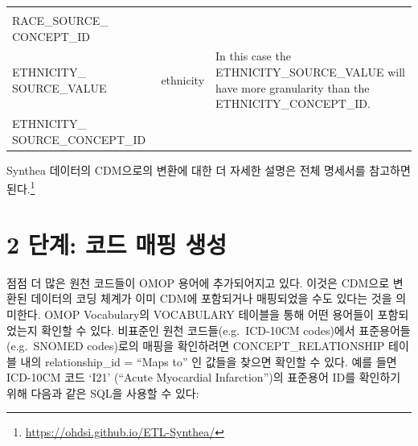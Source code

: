 \documentclass[11pt]{book}
\let\rmarkdownfootnote\footnote%
\def\footnote{\protect\rmarkdownfootnote}
\theoremstyle{definition}
\theoremstyle{definition}
\theoremstyle{definition}
\theoremstyle{remark}
\begin{document}
\begin{longtable}[]{@{}lll@{}}
\begin{minipage}[t]{0.50\columnwidth}
\strut
\end{minipage}\tabularnewline
\begin{minipage}[t]{0.28\columnwidth}\raggedright\strut
RACE\_SOURCE\_ CONCEPT\_ID\strut
\end{minipage} & \begin{minipage}[t]{0.13\columnwidth}\raggedright\strut
\strut
\end{minipage} & \begin{minipage}[t]{0.50\columnwidth}\raggedright\strut
\strut
\end{minipage}\tabularnewline
\begin{minipage}[t]{0.28\columnwidth}\raggedright\strut
ETHNICITY\_ SOURCE\_VALUE\strut
\end{minipage} & \begin{minipage}[t]{0.13\columnwidth}\raggedright\strut
ethnicity\strut
\end{minipage} & \begin{minipage}[t]{0.50\columnwidth}\raggedright\strut
In this case the ETHNICITY\_SOURCE\_VALUE will have more granularity
than the ETHNICITY\_CONCEPT\_ID.\strut
\end{minipage}\tabularnewline
\begin{minipage}[t]{0.28\columnwidth}\raggedright\strut
ETHNICITY\_ SOURCE\_CONCEPT\_ID\strut
\end{minipage} & \begin{minipage}[t]{0.13\columnwidth}\raggedright\strut
\strut
\end{minipage} & \begin{minipage}[t]{0.50\columnwidth}\raggedright\strut
\strut
\end{minipage}\tabularnewline
\bottomrule
\end{longtable}

Synthea 데이터의 CDM으로의 변환에 대한 더 자세한 설명은 전체 명세서를
참고하면 된다.\footnote{\url{https://ohdsi.github.io/ETL-Synthea/}}

\section{2 단계: 코드 매핑 생성}\label{---}

점점 더 많은 원천 코드들이 OMOP 용어에 추가되어지고 있다. 이것은 CDM으로
변환된 데이터의 코딩 체계가 이미 CDM에 포함되거나 매핑되었을 수도 있다는
것을 의미한다. OMOP Vocabulary의 VOCABULARY 테이블을 통해 어떤 용어들이
포함되었는지 확인할 수 있다. 비표준인 원천 코드들(e.g.~ICD-10CM
codes)에서 표준용어들(e.g.~SNOMED codes)로의 매핑을 확인하려면
CONCEPT\_RELATIONSHIP 테이블 내의 relationship\_id = ``Maps to'' 인
값들을 찾으면 확인할 수 있다. 예를 들면 ICD-10CM 코드 `I21' (``Acute
Myocardial Infarction'')의 표준용어 ID를 확인하기 위해 다음과 같은 SQL을
사용할 수 있다:
\end{document}
